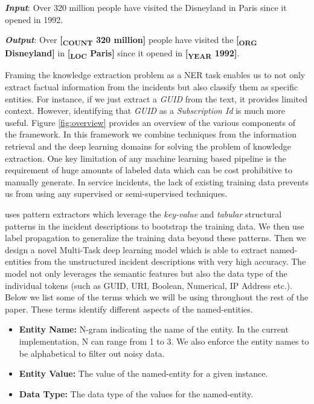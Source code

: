 \smallskip%
\textit{\textbf{Input}}: Over 320 million people have visited the Disneyland in Paris since it opened in 1992.

\smallskip
\textit{\textbf{Output}}: Over \textbf{[\textsubscript{COUNT} 320 million]} people have visited the \textbf{[\textsubscript{ORG} Disneyland]} in \textbf{[\textsubscript{LOC} Paris]} since it opened in \textbf{[\textsubscript{YEAR} 1992]}.

\smallskip%

Framing the knowledge extraction problem as a NER task enables us to not only extract factual information from the incidents but also classify them as specific entities. For instance, if we just extract a \textit{GUID} from the text, it provides limited context. However, identifying that \textit{GUID} as a \textit{Subscription Id} is much more useful. Figure \ref{fig:overview} provides an overview of the various components of the \softner{} framework. In this framework we combine techniques from the information retrieval and the deep learning domains for solving the problem of knowledge extraction. One key limitation of any machine learning based pipeline is the requirement of huge amounts of labeled data which can be cost prohibitive to manually generate. In service incidents, the lack of existing training data prevents us from using any supervised or semi-supervised techniques.

\softner{} uses pattern extractors which leverage the \emph{key-value} and \emph{tabular} structural patterns in the incident descriptions to bootstrap the training data. We then use label propagation to generalize the training data beyond these patterns. Then we design a novel Multi-Task deep learning model which is able to extract named-entities from the unstructured incident descriptions with very high accuracy. The model not only leverages the semantic features but also the data type of the individual tokens (such as GUID, URI, Boolean, Numerical, IP Address etc.). Below we list some of the terms which we will be using throughout the rest of the paper. These terms identify different aspects of the named-entities.

\begin{itemize}
\item \textbf{Entity Name:} N-gram indicating the name of the entity. In the current implementation, N can range from 1 to 3. We also enforce the entity names to be alphabetical to filter out noisy data.
\item \textbf{Entity Value:} The value of the named-entity for a given instance. 
\item \textbf{Data Type:} The data type of the values for the named-entity.
\end{itemize} 

